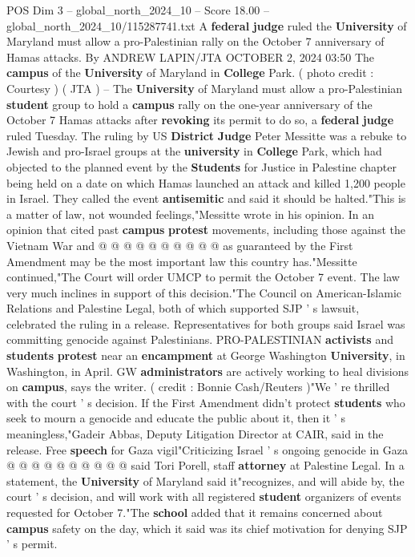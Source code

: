 \begin{textsample}{POS Dim 3 – global\_north\_2024\_10 – Score 18.00 – global\_north\_2024\_10/115287741.txt}  \label{ex:f3_pos_153}
A \textbf{federal} \textbf{judge} ruled the \textbf{University} of Maryland must allow a pro-Palestinian rally on the October 7 anniversary of Hamas attacks.
By ANDREW LAPIN/JTA OCTOBER 2, 2024 03:50 The \textbf{campus} of the \textbf{University} of Maryland in \textbf{College} Park. ( photo credit : Courtesy ) ( JTA ) -- The \textbf{University} of Maryland must allow a pro-Palestinian \textbf{student} group to hold a \textbf{campus} rally on the one-year anniversary of the October 7 Hamas attacks after \textbf{revoking} its permit to do so, a \textbf{federal} \textbf{judge} ruled Tuesday.
The ruling by US \textbf{District} \textbf{Judge} Peter Messitte was a rebuke to Jewish and pro-Israel groups at the \textbf{university} in \textbf{College} Park, which had objected to the planned event by the \textbf{Students} for Justice in Palestine chapter being held on a date on which Hamas launched an attack and killed 1,200 people in Israel.
They called the event \textbf{antisemitic} and said it should be halted."This is a matter of law, not wounded feelings,"Messitte wrote in his opinion.
In an opinion that cited past \textbf{campus} \textbf{protest} movements, including those against the Vietnam War and @ @ @ @ @ @ @ @ @ @ as guaranteed by the First Amendment may be the most important law this country has."Messitte continued,"The Court will order UMCP to permit the October 7 event.
The law very much inclines in support of this decision."The Council on American-Islamic Relations and Palestine Legal, both of which supported SJP ' s lawsuit, celebrated the ruling in a release.
Representatives for both groups said Israel was committing genocide against Palestinians.
PRO-PALESTINIAN \textbf{activists} and \textbf{students} \textbf{protest} near an \textbf{encampment} at George Washington \textbf{University}, in Washington, in April.
GW \textbf{administrators} are actively working to heal divisions on \textbf{campus}, says the writer. ( credit : Bonnie Cash/Reuters )"We ' re thrilled with the court ' s decision.
If the First Amendment didn't protect \textbf{students} who seek to mourn a genocide and educate the public about it, then it ' s meaningless,"Gadeir Abbas, Deputy Litigation Director at CAIR, said in the release.
Free \textbf{speech} for Gaza vigil"Criticizing Israel ' s ongoing genocide in Gaza @ @ @ @ @ @ @ @ @ @ said Tori Porell, staff \textbf{attorney} at Palestine Legal.
In a statement, the \textbf{University} of Maryland said it"recognizes, and will abide by, the court ' s decision, and will work with all registered \textbf{student} organizers of events requested for October 7."The \textbf{school} added that it remains concerned about \textbf{campus} safety on the day, which it said was its chief motivation for denying SJP ' s permit.

\end{textsample}
